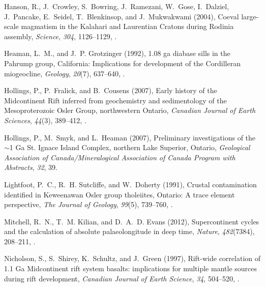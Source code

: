 \documentclass[draft,gc]{AGUTeX}
\begin{document}
\begin{article}
\begin{thebibliography}{24}
Hanson, R., J.~Crowley, S.~Bowring, J.~Ramezani, W.~Gose, I.~Dalziel,
  J.~Pancake, E.~Seidel, T.~Blenkinsop, and J.~Mukwakwami (2004), Coeval
  large-scale magmatism in the {K}alahari and {L}aurentian {C}ratons during
  {R}odinia assembly, \textit{Science}, \textit{304}, 1126--1129,
  .
  
Heaman, L.~M., and J.~P. Grotzinger (1992), 1.08 ga diabase sills in the
  {P}ahrump group, {C}alifornia: Implications for development of the
  {C}ordilleran miogeocline, \textit{Geology}, \textit{20}(7), 637--640,
  .

Hollings, P., P.~Fralick, and B.~Cousens (2007{}), {Early history
  of the Midcontinent Rift inferred from geochemistry and sedimentology of the
  Mesoproterozoic Osler Group, northwestern Ontario}, \textit{Canadian Journal
  of Earth Sciences}, \textit{44}(3), 389--412, .

Hollings, P., M.~Smyk, and L.~Heaman (2007{}), Preliminary
  investigations of the $\sim$1 {Ga St. Ignace Island Complex, northern Lake
  Superior, Ontario}, \textit{Geological Association of Canada/Mineralogical
  Association of Canada Program with Abstracts}, \textit{32}, 39.

Lightfoot, P.~C., R.~H. Sutcliffe, and W.~Doherty (1991), Crustal contamination
  identified in {K}eweenawan {O}sler group tholeiites, {O}ntario: A trace
  element perspective, \textit{The Journal of Geology}, \textit{99}(5),
  739--760, .

Mitchell, R.~N., T.~M. Kilian, and D.~A.~D. Evans (2012), Supercontinent cycles
  and the calculation of absolute palaeolongitude in deep time,
  \textit{Nature}, \textit{482}(7384), 208--211, .

Nicholson, S., S.~Shirey, K.~Schultz, and J.~Green (1997), Rift-wide
  correlation of 1.1 {G}a {M}idcontinent rift system basalts: implications for
  multiple mantle sources during rift development, \textit{Canadian Journal of
  Earth Science}, \textit{34}, 504--520, .


\end{thebibliography}
\end{article}
\end{document}
